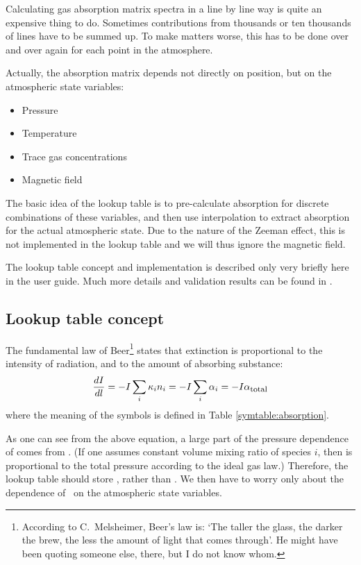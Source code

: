 Calculating gas absorption matrix spectra in a line by line way
is quite an expensive thing to do. Sometimes contributions from
thousands or ten thousands of lines have to be summed up. To make
matters worse, this has to be done over and over again for each point
in the atmosphere.

Actually, the absorption matrix depends not directly on position,
but on the atmospheric state variables:
\begin{itemize}
\item Pressure
\item Temperature
\item Trace gas concentrations
\item Magnetic field
\end{itemize}

The basic idea of the lookup table is to pre-calculate absorption for
discrete combinations of these variables, and then use interpolation
to extract absorption for the actual atmospheric state. Due to the nature of
the Zeeman effect, this is not implemented in the lookup table and we will 
thus ignore the magnetic field.

The lookup table concept and implementation is described only very
briefly here in the user guide. Much more details and validation
results can be found in \citet{buehler:absor:11}.

\subsection{Lookup table concept}

The fundamental law of Beer\footnote{According to C.\ Melsheimer,
  Beer's law is: `The taller the glass, the darker the brew, the less
  the amount of light that comes through'. He might have been quoting
  someone else, there, but I do not know whom.} states that extinction
is proportional to the intensity of radiation, and to the amount of
absorbing substance:
\begin{equation}
  \label{eq:lookup:beer}
  \frac{d I}{d l}
  =
  - I \sum_i {\kappa}_{i} {n}_{i}
  =
  - I \sum_i {\alpha}_{i}
  =
  - I {\alpha}_{\mbox{\footnotesize total}}
\end{equation}
where the meaning of the symbols is defined in Table
\ref{symtable:absorption}. 

As one can see from the above equation, a large part of the pressure
dependence of  comes from . (If one assumes
constant volume mixing ratio of species $i$, then  is
proportional to the total pressure according to the ideal gas law.) 
Therefore, the lookup table should store \AbsXsec, rather than
\AbsCoef. We then have to worry only about the dependence of \AbsXsec\
on the atmospheric state variables.

